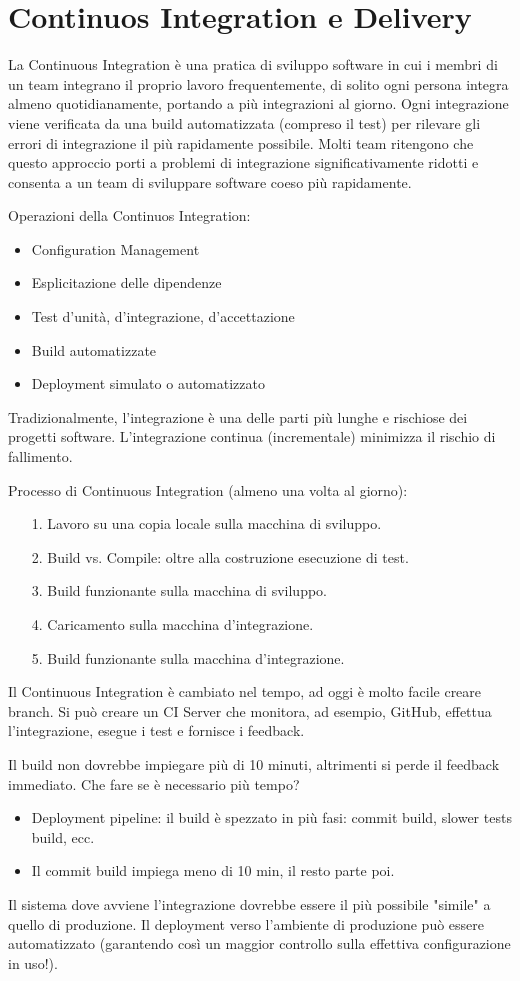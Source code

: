 \documentclass[a4paper,12pt,titlepage,oneside]{book}
\begin{document}
\chapter{Continuos Integration e Delivery}
La Continuous Integration è una pratica di sviluppo software in cui i membri di un team integrano il proprio lavoro frequentemente, di solito ogni persona integra almeno quotidianamente, 
portando a più integrazioni al giorno. Ogni integrazione viene verificata da una build automatizzata (compreso il test) per rilevare gli errori di integrazione il più rapidamente possibile. 
Molti team ritengono che questo approccio porti a problemi di integrazione significativamente ridotti e consenta a un team di sviluppare software coeso più rapidamente.

Operazioni della Continuos Integration:
\begin{itemize}
    \item Configuration Management
    \item Esplicitazione delle dipendenze
    \item Test d'unità, d'integrazione, d'accettazione
    \item Build automatizzate
    \item Deployment simulato o automatizzato
\end{itemize}
Tradizionalmente, l’integrazione è una delle parti più lunghe e rischiose dei progetti software. L'integrazione continua (incrementale) minimizza il rischio di fallimento.

Processo di Continuous Integration (almeno una volta al giorno):
\begin{itemize}
    \item[1.] Lavoro su una copia locale sulla macchina di sviluppo.
    \item[2.] Build vs. Compile: oltre alla costruzione esecuzione di test.
    \item[3.] Build funzionante sulla macchina di sviluppo.
    \item[4.] Caricamento sulla macchina d’integrazione.
    \item[5.] Build funzionante sulla macchina d’integrazione. 
\end{itemize}
Il Continuous Integration è cambiato nel tempo, ad oggi è molto facile creare branch.
Si può creare un CI Server che monitora, ad esempio, GitHub, effettua l'integrazione, esegue i test e fornisce i feedback.

Il build non dovrebbe impiegare più di 10 minuti, altrimenti si perde il feedback immediato. Che fare se è necessario più tempo?
\begin{itemize}
    \item Deployment pipeline: il build è spezzato in più fasi: commit build, slower tests build, ecc.
    \item Il commit build impiega meno di 10 min, il resto parte poi.
\end{itemize}
Il sistema dove avviene l’integrazione dovrebbe essere il più possibile "simile" a quello di produzione.
Il deployment verso l’ambiente di produzione può essere automatizzato (garantendo così un maggior controllo sulla effettiva configurazione in uso!).
\end{document}
